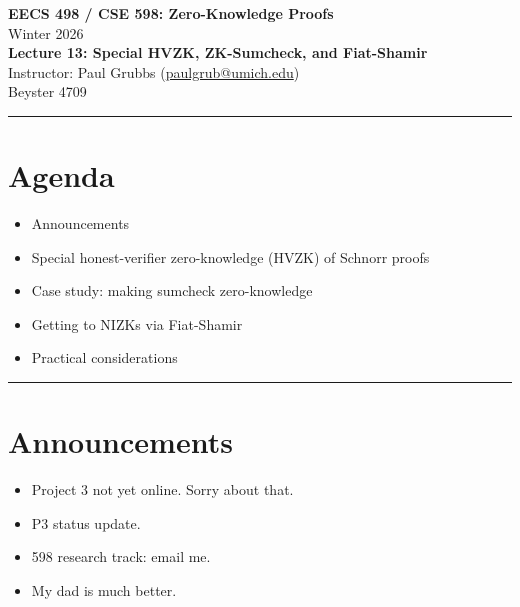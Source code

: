 \documentclass[11pt]{article}
\begin{document}
\begin{center}
  {\LARGE \textbf{EECS 498 / CSE 598: Zero-Knowledge Proofs}}\\[6pt]
  {\large Winter 2026}\\[4pt]
  {\large \textbf{Lecture 13: Special HVZK, ZK-Sumcheck, and Fiat-Shamir}}\\[4pt]
  {\large Instructor: Paul Grubbs \quad (\href{mailto:paulgrub@umich.edu}{paulgrub@umich.edu})}\\[2pt]
  {\normalsize Beyster 4709}
\end{center}

\hrule
\vspace{1em}

\section*{Agenda}
\begin{itemize}
  \item Announcements
  \item Special honest-verifier zero-knowledge (HVZK) of Schnorr proofs
  \item Case study: making sumcheck zero-knowledge
  \item Getting to NIZKs via Fiat-Shamir
  \item Practical considerations
\end{itemize}

\hrule
\vspace{1em}

\section{Announcements}

\begin{itemize}
  \item Project 3 not yet online. Sorry about that.
  \item P3 status update.
  \item 598 research track: email me.
  \item My dad is much better.
\end{itemize}
\end{document}
